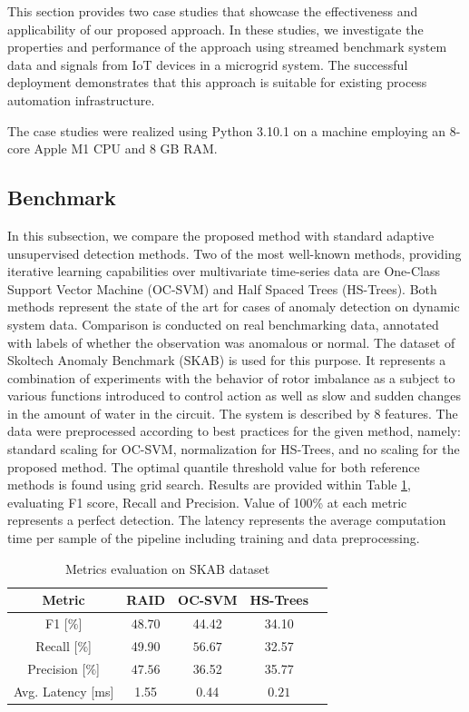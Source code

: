 This section provides two case studies that showcase the effectiveness and applicability of our proposed approach. In these studies, we investigate the properties and performance of the approach using streamed benchmark system data and signals from IoT devices in a microgrid system.  The successful deployment demonstrates that this approach is suitable for existing process automation infrastructure.

The case studies were realized using Python 3.10.1 on a machine employing an 8-core Apple M1 CPU and 8 GB RAM.

\subsection{Benchmark}\label{AA:Benchmark}
In this subsection, we compare the proposed method with standard adaptive unsupervised detection methods. Two of the most well-known methods, providing iterative learning capabilities over multivariate time-series data are One-Class Support Vector Machine (OC-SVM) and Half Spaced Trees (HS-Trees). Both methods represent the state of the art for cases of anomaly detection on dynamic system data. Comparison is conducted on real benchmarking data, annotated with labels of whether the observation was anomalous or normal. The dataset of Skoltech Anomaly Benchmark (SKAB) \cite{skab2020} is used for this purpose. It represents a combination of experiments with the behavior of rotor imbalance as a subject to various functions introduced to control action as well as slow and sudden changes in the amount of water in the circuit. The system is described by 8 features. The data were preprocessed according to best practices for the given method, namely: standard scaling for OC-SVM, normalization for HS-Trees, and no scaling for the proposed method. The optimal quantile threshold value for both reference methods is found using grid search. Results are provided within Table \ref{tab:perf_comp}, evaluating F1 score, Recall and Precision. Value of 100\% at each metric represents a perfect detection. The latency represents the average computation time per sample of the pipeline including training and data preprocessing. 

\begin{table}[htbp]
  \caption{Metrics evaluation on SKAB dataset}
  \begin{center}
  \label{tab:perf_comp}
  \begin{tabular}{|c|c|c|c|c|}
    \hline
    Metric & RAID & OC-SVM & HS-Trees \\
    \hline
    F1 [$\%$] & $\boldsymbol{48.70}$ & 44.42 & 34.10 \\
    \hline
    Recall [$\%$] & 49.90 & $\boldsymbol{56.67}$ & 32.57 \\
    \hline
    Precision [$\%$] & $\boldsymbol{47.56}$ & 36.52 & 35.77 \\
    \hline
    Avg. Latency [ms] & 1.55 & 0.44 & $\boldsymbol{0.21}$ \\
    \hline
  \end{tabular}
  \end{center}
\end{table}

